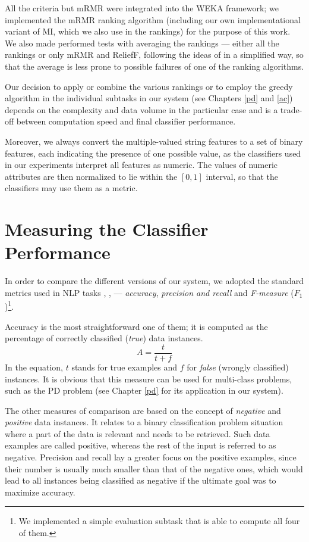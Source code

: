 \documentclass[12pt,notitlepage]{report}
\begin{document}
All the criteria but mRMR were integrated into the WEKA framework; we implemented the mRMR ranking algorithm (including our own implementational variant of MI, which we also use in the rankings) for the purpose of this work. We also made performed tests with averaging the rankings --- either all the rankings or only mRMR and ReliefF, following the ideas of \citet{zhang08} in a simplified way, so that the average is less prone to possible failures of one of the ranking algorithms.

Our decision to apply or combine the various rankings or to employ the greedy algorithm in the individual subtasks in our system (see Chapters \ref{pd} and \ref{ac}) depends on the complexity and data volume in the particular case and is a trade-off between computation speed and final classifier performance.

Moreover, we always convert the multiple-valued string features to a set of binary features, each indicating the presence of one possible value, as the classifiers used in our experiments interpret all features as numeric. The values of numeric attributes are then normalized \citep[p. 56f.]{witten05} to lie within the $[0,1]$ interval, so that the classifiers may use them as a metric.

\section{Measuring the Classifier Performance}\label{metrics}

In order to compare the different versions of our system, we adopted the standard metrics used in NLP tasks \citep[p. 268ff.]{manning00}, \citep[p. 142ff.]{manning08}, \citep[p. 171ff.]{witten05} --- \emph{accuracy}, \emph{precision and recall}  and \emph{F-measure} ($F_1$)\footnote{We implemented a simple evaluation subtask that is able to compute all four of them.}. 

Accuracy is the most straightforward one of them; it is computed as the percentage of correctly classified (\emph{true}) data instances.
\begin{equation}
A = \frac{t}{t + f}
\end{equation}
In the equation, $t$ stands for true examples and $f$ for \emph{false} (wrongly classified) instances. It is obvious that this measure can be used for multi-class problems, such as the PD problem (see Chapter \ref{pd} for its application in our system).

The other measures of comparison are based on the concept of \emph{negative} and \emph{positive} data instances. It relates to a binary classification problem situation where a part of the data is relevant and needs to be retrieved. Such data examples are called positive, whereas the rest of the input is referred to as negative. Precision and recall lay a greater focus on the positive examples, since their number is usually much smaller than that of the negative ones, which would lead to all instances being classified as negative if the ultimate goal was to maximize accuracy.
\end{document}

